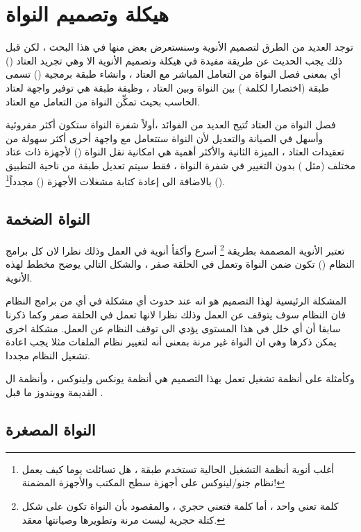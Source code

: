 \documentclass[document.tex]{subfiles}
\begin{document}
\section{هيكلة وتصميم النواة}
توجد العديد من الطرق لتصميم الأنوية وسنستعرض بعض منها في هذا البحث ، لكن قبل ذلك يجب الحديث عن طريقة مفيدة في هيكلة وتصميم الأنوية الا وهي تجريد العتاد () أي بمعنى فصل النواة من التعامل المباشر مع العتاد ، وانشاء طبقة برمجية () تسمى طبقة  (اختصارا لكلمة ) بين النواة وبين العتاد ، وظيفة طبقة  هي توفير واجهة لعتاد الحاسب بحيث تمكِّن النواة من التعامل مع العتاد.


فصل النواة من العتاد تُتيح العديد من الفوائد ،أولاً شفرة النواة ستكون أكثر مقروئية وأسهل في الصيانة والتعديل لأن النواة ستتعامل مع واجهة أخرى أكثر سهولة من تعقيدات العتاد ، الميزة الثانية والأكثر أهمية هي امكانية نقل النواة () لأجهزة ذات عتاد مختلف (مثل ) بدون التغيير في شفرة النواة ، فقط سيتم تعديل طبقة  من ناحية التطبيق () بالاضافة الى إعادة كتابة مشغلات الأجهزة () مجدداً\footnote{أغلب أنوية أنظمة التشغيل الحالية تستخدم طبقة ، هل تسائلت يوما كيف يعمل نظام جنو/لينوكس على أجهزة سطح المكتب والأجهزة المضمنة!}.

\subsection{النواة الضخمة }
تعتبر الأنوية المصممة بطريقة \footnote{كلمة  تعني واحد ، أما كلمة  فتعني حجري ، والمقصود بأن النواة تكون على شكل كتلة حجرية ليست مرنة وتطويرها وصيانتها معقد.} أسرع وأكفأ أنوية في العمل وذلك نظرا لان كل برامج النظام () تكون ضمن النواة وتعمل في الحلقة صفر ، والشكل التالي يوضح مخطط لهذه الأنوية.


المشكلة الرئيسية لهذا التصميم هو انه عند حدوث أي مشكلة في أي من برامج النظام فان النظام سوف يتوقف عن العمل وذلك نظرا لانها تعمل في الحلقة صفر وكما ذكرنا سابقا أن أي خلل في هذا المستوى يؤدي الى توقف النظام عن العمل. مشكلة اخرى يمكن ذكرها وهي ان النواة غير مرنة بمعنى أنه لتغيير نظام الملفات مثلا يجب اعادة تشغيل النظام مجددا.

وكأمثلة على أنظمة تشغيل تعمل بهذا التصميم هي أنظمة يونكس ولينوكس ، وأنظمة ال  القديمة وويندوز  ما قبل .

\subsection{النواة المصغرة }
\end{document}
